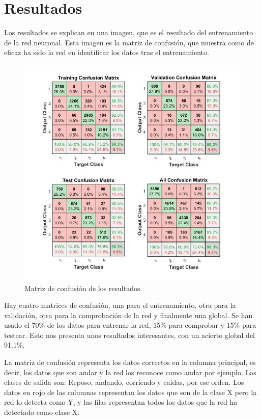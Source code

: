\documentclass[12pt]{article}
\numberwithin{equation}{section}
\begin{document}
\newpage
\section{Resultados}

Los resultados se explican en una imagen, que es el resultado del entrenamiento de la red neuronal. Esta imagen es la matriz de confusión, que muestra como de eficaz ha sido la red en identificar los datos tras el entrenamiento.


\begin{figure}[h]
    \centering
    \includegraphics[width=1\textwidth]{confussionplaceholder.jpg}
    \caption{Matriz de confusión de los resultados.}
    \label{fig:mesh2}
\end{figure}

Hay cuatro matrices de confusión, una para el entrenamiento, otra para la validación, otra para la comprobación de la red y finalmente una global. Se han usado el 70\% de los datos para entrenar la red, 15\% para comprobar y 15\% para testear. Esto nos presenta unos resultados interesantes, con un acierto global del 91.1\%.

La matriz de confusión representa los datos correctos en la columna principal, es decir, los datos que son andar y la red los reconoce como andar por ejemplo. Las clases de salida son: Reposo, andando, corriendo y caídas, por ese orden. Los datos en rojo de las columnas representan los datos que son de la clase X pero la red lo detecta como Y, y las filas representan todos los datos que la red ha detectado como clase X.
\end{document}
